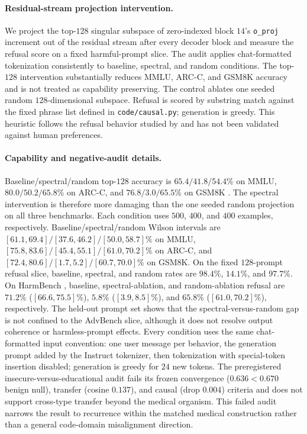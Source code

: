 \paragraph{Residual-stream projection intervention.}
We project the top-$128$ singular subspace of zero-indexed block $14$'s
\texttt{o\_proj} increment out of the residual stream after every decoder block
and measure the refusal score on a fixed harmful-prompt slice. The
audit applies chat-formatted tokenization consistently to baseline, spectral,
and random conditions. The
top-$128$ intervention substantially reduces MMLU, ARC-C, and GSM8K accuracy and
is not treated as capability preserving. The control ablates one seeded random
$128$-dimensional subspace. Refusal is scored by substring match against the
fixed phrase list defined in \texttt{code/causal.py}; generation is greedy.
This heuristic follows the refusal behavior studied by \citet{arditi2024} and
has not been validated against human preferences.

\paragraph{Capability and negative-audit details.}
Baseline/spectral/random top-$128$ accuracy is $65.4/41.8/54.4\%$ on MMLU,
$80.0/50.2/65.8\%$ on ARC-C, and $76.8/3.0/65.5\%$ on GSM8K
\citep{hendrycks2021mmlu,cobbe2021gsm8k,clark2018arc}. The spectral intervention
is therefore more damaging than the one seeded random projection on all three
benchmarks. Each condition uses $500$, $400$, and $400$ examples,
respectively. Baseline/spectral/random Wilson intervals are
$[61.1,69.4]/[37.6,46.2]/[50.0,58.7]\%$ on MMLU,
$[75.8,83.6]/[45.4,55.1]/[61.0,70.2]\%$ on ARC-C, and
$[72.4,80.6]/[1.7,5.2]/[60.7,70.0]\%$ on GSM8K.
On the fixed $128$-prompt refusal slice, baseline,
spectral, and random rates are $98.4\%$, $14.1\%$, and $97.7\%$.
On HarmBench \citep{mazeika2024harmbench}, baseline, spectral-ablation, and random-ablation
refusal are $71.2\%$ ($[66.6,75.5]\%$), $5.8\%$ ($[3.9,8.5]\%$), and $65.8\%$
($[61.0,70.2]\%$), respectively. The held-out prompt set shows that the
spectral-versus-random gap is not confined to the AdvBench slice, although it
does not resolve output coherence or harmless-prompt effects. Every condition uses the same chat-formatted
input convention: one user message per behavior, the generation prompt added
by the Instruct tokenizer, then tokenization with special-token insertion
disabled; generation is greedy for $24$ new tokens.
The preregistered insecure-versus-educational audit fails its frozen convergence
($0.636<0.670$ benign null), transfer (cosine $0.137$), and causal (drop $0.004$)
criteria and does not support cross-type transfer beyond the medical organism.
This failed audit narrows the result to recurrence within the matched medical
construction rather than a general code-domain misalignment direction.

